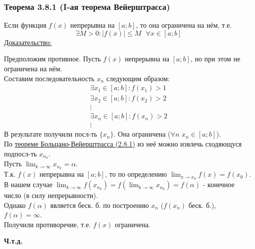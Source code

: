\documentclass[12pt]{article}
\def\posl#1#2{\{#1_{#2}\}}
\begin{document}
    \subsubsection*{Теорема 3.8.1 (I-ая теорема Вейерштрасса)}\label{th:3.8.1}
    Если функция $f(x)$ непрерывна на $[a; b]$, то она ограничена на нём, т.е.
    \[ \exists M > 0 : \left|f(x)\right| \le M \text{ } \forall x \in [a; b] \]\noindent
    \underline{Доказательство:}
    \begin{adjustwidth}{1.5em}{1.5em}
        Предположим противное. Пусть $f(x)$ непрерывна на $[a; b]$, но при этом не ограничена на нём.\\
        Составим последовательность $x_n$ следующим образом:
            \begin{gather*}
                \exists x_1 \in [a; b] : f(x_1) > 1\\
                \exists x_2 \in [a; b] : f(x_2) > 2\\
                \vdots\\
                \exists x_n \in [a; b] : f(x_n) > 2\\
                \vdots
            \end{gather*}
        В результате получили посл-ть $\posl{x}{n}$. Она ограничена ($\forall n$ $x_n \in [a; b]$).\\
        По \hyperref[th:2.8.1]{теореме Больцано-Вейерштрасса (2.8.1)} из неё можно извлечь сходяющуся подпосл-ть $x_{n_k}$.\\
        Пусть $\lim_{k\to\infty}x_{n_k} = \alpha$.\\
        Т.к. $f(x)$ непрерывна на $[a; b]$, то по определению $\lim_{x\to x_0} f(x) = f(x_0)$.\\
        В нашем случае $\lim_{k\to\infty} f(x_{n_k}) = f(\lim_{k\to\infty}x_{n_{k}}) = f(\alpha)$ - конечное число (в силу непрерывности).\\
        Однако $f(\alpha)$ является беск. б. по построению $x_n$ ($f(x_n)$ беск. б.), $f(\alpha) = \infty$.\\
        Получили противоречие, т.е. $f(x)$ ограничена.
        \begin{center}
            \textbf{Ч.т.д.}
        \end{center} 
    \end{adjustwidth}
\end{document}
